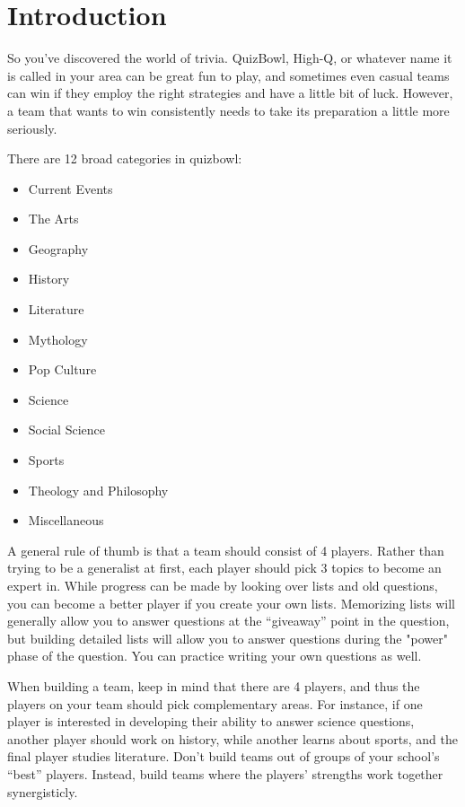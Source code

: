 \chapter{Introduction}
So you've discovered the world of trivia. QuizBowl, High-Q, or whatever name it is called in your area can be great fun to play, and sometimes even casual teams can win if they employ the right strategies and have a little bit of luck.  However, a team that wants to win consistently needs to take its preparation a little more seriously.  

There are 12 broad categories in quizbowl:
\begin{multicols}{2}
\begin{itemize}
	\item Current Events
	\item The Arts
	\item Geography
	\item History
	\item Literature
	\item Mythology
	\item Pop Culture
	\item Science
	\item Social Science
	\item Sports
	\item Theology and Philosophy
	\item Miscellaneous
\end{itemize}
\end{multicols}
A general rule of thumb is that a team should consist of 4 players.  Rather than trying to be a generalist at first, each player should pick 3 topics to become an expert in.  While progress can be made by looking over lists and old questions, you can become a better player if you create your own lists.   Memorizing lists will generally allow you to answer questions at the ``giveaway'' point in the question, but building detailed lists will allow you to answer questions during the "power" phase of the question.  You can practice writing your own questions as well.  

When building a team, keep in mind that there are 4 players, and thus the players on your team should pick complementary areas.  For instance, if one player is interested in developing their ability to answer science questions, another player should work on history, while another learns about sports, and the final player studies literature.  Don't build teams out of groups of your school's ``best'' players.  Instead, build teams where the players' strengths work together synergisticly. 

